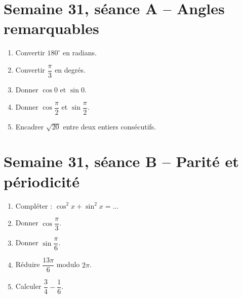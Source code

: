 \section{Semaine 31, séance A -- Angles remarquables}
\begin{enumerate}
  \item Convertir $180^\circ$ en radians.
  \item Convertir $\dfrac{\pi}{3}$ en degrés.
  \item Donner $\cos0$ et $\sin0$.
  \item Donner $\cos\dfrac{\pi}{2}$ et $\sin\dfrac{\pi}{2}$.
  \item Encadrer $\sqrt{20}$ entre deux entiers consécutifs.
\end{enumerate}

\section{Semaine 31, séance B -- Parité et périodicité}
\begin{enumerate}
  \item Compléter : $\cos^2x+\sin^2x=\ldots$
  \item Donner $\cos\dfrac{\pi}{3}$.
  \item Donner $\sin\dfrac{\pi}{6}$.
  \item Réduire $\dfrac{13\pi}{6}$ modulo $2\pi$.
  \item Calculer $\dfrac34-\dfrac16$.
\end{enumerate}

